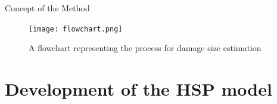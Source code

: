 \documentclass[10pt]{beamer} %
\begin{document}

	\begin{frame}[label=frame5]{Concept of the Method}

		\begin{figure}

			\texttt{[image: flowchart.png]}

			\caption{A flowchart representing the process for damage size estimation}

		\end{figure}

	\end{frame}

\section{Development of the HSP model}
\end{document}
